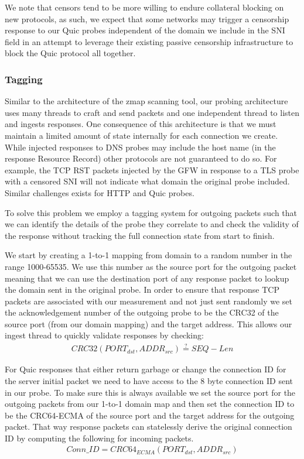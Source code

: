 We note that censors tend to be more willing to endure collateral blocking on
new protocols, as such, we expect that some networks may trigger a censorship
response to our Quic probes independent of the domain we include in the SNI
field in an attempt to leverage their existing passive censorship infrastructure
to block the Quic protocol all together.

\subsubsection{Tagging}

Similar to the architecture of the zmap scanning tool, our probing architecture
uses many threads to craft and send packets and one independent thread to listen
and ingests responses. One consequence of this architecture is that we must
maintain a limited amount of state internally for each connection we create.
While injected responses to DNS probes may include the host name (in the
response Resource Record) other protocols are not guaranteed to do so. For
example, the TCP RST packets injected by the GFW in response to a TLS probe with
a censored SNI will not indicate what domain the original probe included.
Similar challenges exists for HTTP and Quic probes.

To solve this problem we employ a tagging system for outgoing packets such that
we can identify the details of the probe they correlate to and check the
validity of the response without tracking the full connection state from start
to finish.

We start by creating a 1-to-1 mapping from domain to a random number in the
range 1000-65535. We use this number as the source port for the outgoing packet
meaning that we can use the destination port of any response packet to lookup
the domain sent in the original probe. In order to ensure that response TCP
packets are associated with our measurement and not just sent randomly we set
the acknowledgement number of the outgoing probe to be the CRC32 of the source
port (from our domain mapping) and the target address. This allows our ingest
thread to quickly validate responses by checking:
\begin{gather*}
CRC32(PORT_{dst},ADDR_{src}) \stackrel{?}{=} SEQ - Len
\end{gather*}

For Quic responses that either return garbage or change the connection ID for
the server initial packet we need to have access to the 8 byte connection ID
sent in our probe. To make sure this is always available we set the source port
for the outgoing packets from our 1-to-1 domain map and then set the connection
ID to be the CRC64-ECMA of the source port and the target address for the
outgoing packet. That way response packets can statelessly derive the original
connection ID by computing the following for incoming packets.
\begin{gather*}
Conn\_ID = CRC64_{ECMA}(PORT_{dst},ADDR_{src})
\end{gather*}


